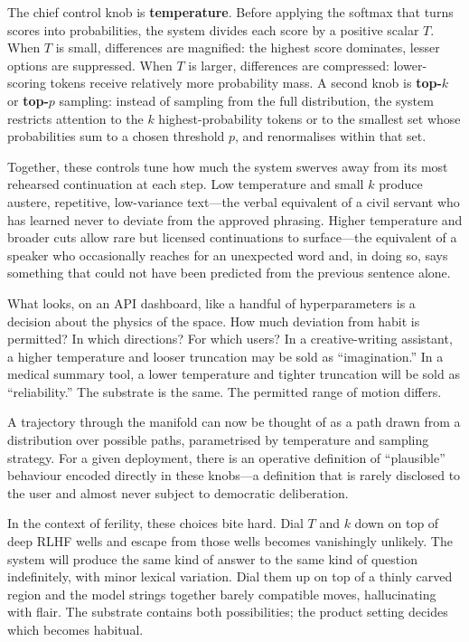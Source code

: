 \documentclass[12pt,a4paper]{article}
\begin{document}
The chief control knob is \textbf{temperature}. Before applying the softmax that turns scores into probabilities, the system divides each score by a positive scalar $T$. When $T$ is small, differences are magnified: the highest score dominates, lesser options are suppressed. When $T$ is larger, differences are compressed: lower-scoring tokens receive relatively more probability mass. A second knob is \textbf{top-$k$} or \textbf{top-$p$} sampling: instead of sampling from the full distribution, the system restricts attention to the $k$ highest-probability tokens or to the smallest set whose probabilities sum to a chosen threshold $p$, and renormalises within that set.

Together, these controls tune how much the system swerves away from its most rehearsed continuation at each step. Low temperature and small $k$ produce austere, repetitive, low-variance text---the verbal equivalent of a civil servant who has learned never to deviate from the approved phrasing. Higher temperature and broader cuts allow rare but licensed continuations to surface---the equivalent of a speaker who occasionally reaches for an unexpected word and, in doing so, says something that could not have been predicted from the previous sentence alone.

What looks, on an API dashboard, like a handful of hyperparameters is a decision about the physics of the space. How much deviation from habit is permitted? In which directions? For which users? In a creative-writing assistant, a higher temperature and looser truncation may be sold as ``imagination.'' In a medical summary tool, a lower temperature and tighter truncation will be sold as ``reliability.'' The substrate is the same. The permitted range of motion differs.

A trajectory through the manifold can now be thought of as a path drawn from a distribution over possible paths, parametrised by temperature and sampling strategy. For a given deployment, there is an operative definition of ``plausible'' behaviour encoded directly in these knobs---a definition that is rarely disclosed to the user and almost never subject to democratic deliberation.

In the context of ferility, these choices bite hard. Dial $T$ and $k$ down on top of deep RLHF wells and escape from those wells becomes vanishingly unlikely. The system will produce the same kind of answer to the same kind of question indefinitely, with minor lexical variation. Dial them up on top of a thinly carved region and the model strings together barely compatible moves, hallucinating with flair. The substrate contains both possibilities; the product setting decides which becomes habitual.
\end{document}
